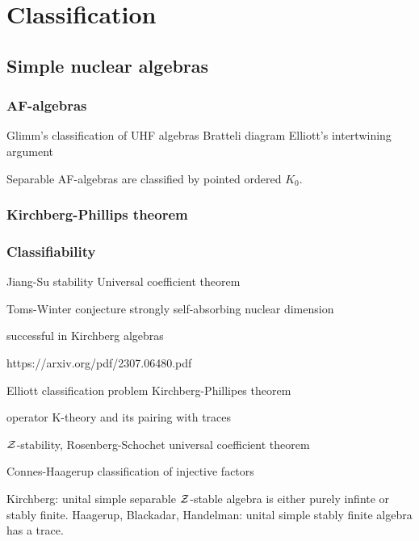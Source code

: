 \documentclass{../../large}
\begin{document}
\chapter{}








\part{Classification}
\chapter{Simple nuclear algebras}


\section{AF-algebras}

Glimm's classification of UHF algebras
Bratteli diagram
Elliott's intertwining argument

Separable AF-algebras are classified by pointed ordered $K_0$.


\section{Kirchberg-Phillips theorem}

\section{Classifiability}
Jiang-Su stability
Universal coefficient theorem

Toms-Winter conjecture
strongly self-absorbing
nuclear dimension




successful in Kirchberg algebras


https://arxiv.org/pdf/2307.06480.pdf

Elliott classification problem
Kirchberg-Phillipes theorem

operator K-theory and its pairing with traces

$\mathcal{Z}$-stability, Rosenberg-Schochet universal coefficient theorem

Connes-Haagerup classification of injective factors

Kirchberg: unital simple separable $\mathcal{Z}$-stable algebra is either purely infinte or stably finite.
Haagerup, Blackadar, Handelman: unital simple stably finite algebra has a trace.
\end{document}
